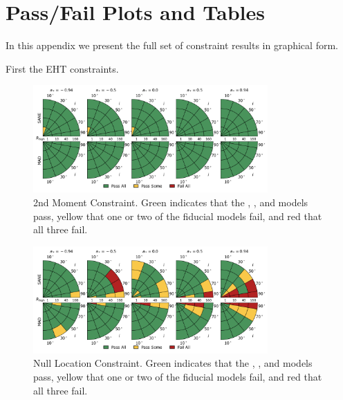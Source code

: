 \section{Pass/Fail Plots and Tables}\label{app:tables}


In this appendix we present the full set of constraint results in graphical form. 

First the EHT constraints. 

\begin{figure}
  \centering
  \includegraphics[width=0.8\textwidth]{./figures/230GHz_size_Constraints.png}
  \caption{2nd Moment Constraint.  Green indicates that the \kharma, \bhac, and \hamr models pass, yellow that one or two of the fiducial models fail, and red that all three fail.}
  \label{fig:230GHz_size_pizza}
\end{figure}
\begin{figure}
  \centering
  \includegraphics[width=0.8\textwidth]{./figures/Null_loc_Constraints.png}
  \caption{Null Location Constraint.  Green indicates that the \kharma, \bhac, and \hamr models pass, yellow that one or two of the fiducial models fail, and red that all three fail.}
  \label{fig:null_pizza}
\end{figure}
